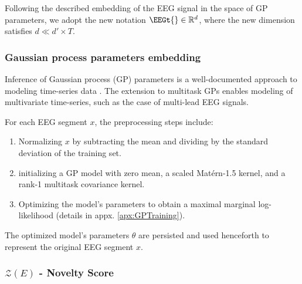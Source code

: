 Following the described embedding of the EEG signal in the space of GP parameters, we adopt the new notation $\EEGt{} \in \mathbb{R}^d$, where the new dimension satisfies $d \ll d' \times T$.

\subsubsection{Gaussian process parameters embedding}
Inference of Gaussian process (GP) parameters is a well-documented approach to modeling time-series data \cite{rasmussen2003gaussian}. The extension to multitask GPs enables modeling of multivariate time-series, such as the case of multi-lead EEG signals.



For each EEG segment $x$, the preprocessing steps include:

\begin{enumerate}[label=\roman*]
    \item Normalizing $x$ by subtracting the mean and dividing by the standard deviation of the training set.
    \item initializing a GP model with zero mean, a scaled Matérn-1.5 kernel, and a rank-1 multitask covariance kernel.
    \item Optimizing the model's parameters to obtain a maximal marginal log-likelihood (details in appx. \ref{apx:GPTraining}).
\end{enumerate}

The optimized model's parameters $\theta$ are persisted and used henceforth to represent the original EEG segment $x$.


\subsubsection{$\mathcal{Z}(E)$ - Novelty Score}
%
%


